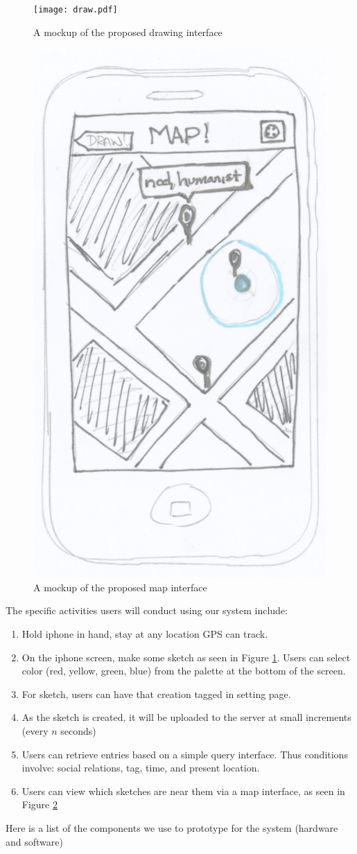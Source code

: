 \documentclass{chi2009}
\begin{document}
\begin{figure}
\centering
\texttt{[image: draw.pdf]}
\caption{A mockup of the proposed drawing interface}
\label{fig:draw}
\end{figure}

\begin{figure}
\centering
\includegraphics[width=.3\textwidth]{map.pdf}
\caption{A mockup of the proposed map interface}
\label{fig:map}
\end{figure}

The specific activities users will conduct using our system include:
\begin{enumerate}
\item Hold iphone in hand, stay at any location GPS can track.
\item On the iphone screen, make some sketch as seen in Figure \ref{fig:draw}. Users can select color (red, yellow, green, blue) from the palette at the bottom of the screen.
\item For sketch, users can have that creation tagged in setting page.
\item As the sketch is created, it will be uploaded to the server at small
	increments (every $n$ seconds)
\item Users can retrieve entries based on a simple query interface. Thus
	conditions involve: social relations, tag, time, and present location.
\item Users can view which sketches are near them via a map interface, as seen
	in Figure \ref{fig:map}
\end{enumerate}

Here is a list of the components we use to prototype for
the system (hardware and software)
\end{document}
